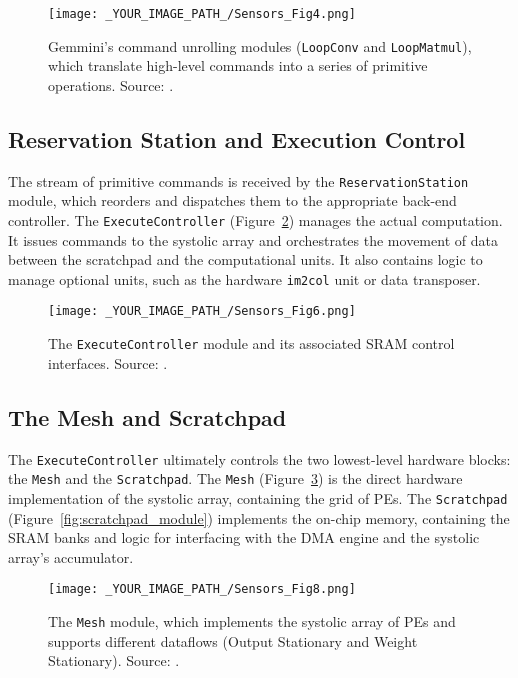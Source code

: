 \begin{figure}[htbp]
    \centering
    \texttt{[image: \_YOUR\_IMAGE\_PATH\_/Sensors\_Fig4.png]}
    \caption{Gemmini's command unrolling modules (\texttt{LoopConv} and \texttt{LoopMatmul}), which translate high-level commands into a series of primitive operations. Source: \cite{gookyi2023gemmini_case_study}.}
    \label{fig:command_unrollers}
\end{figure}

\subsection{Reservation Station and Execution Control}
The stream of primitive commands is received by the \texttt{ReservationStation} module, which reorders and dispatches them to the appropriate back-end controller. The \texttt{ExecuteController} (Figure~\ref{fig:execute_controller}) manages the actual computation. It issues commands to the systolic array and orchestrates the movement of data between the scratchpad and the computational units. It also contains logic to manage optional units, such as the hardware \texttt{im2col} unit or data transposer.

\begin{figure}[htbp]
    \centering
    \texttt{[image: \_YOUR\_IMAGE\_PATH\_/Sensors\_Fig6.png]}
    \caption{The \texttt{ExecuteController} module and its associated SRAM control interfaces. Source: \cite{gookyi2023gemmini_case_study}.}
    \label{fig:execute_controller}
\end{figure}

\subsection{The Mesh and Scratchpad}
The \texttt{ExecuteController} ultimately controls the two lowest-level hardware blocks: the \texttt{Mesh} and the \texttt{Scratchpad}. The \texttt{Mesh} (Figure~\ref{fig:mesh_module}) is the direct hardware implementation of the systolic array, containing the grid of PEs. The \texttt{Scratchpad} (Figure~\ref{fig:scratchpad_module}) implements the on-chip memory, containing the SRAM banks and logic for interfacing with the DMA engine and the systolic array's accumulator.

\begin{figure}[htbp]
    \centering
    \texttt{[image: \_YOUR\_IMAGE\_PATH\_/Sensors\_Fig8.png]}
    \caption{The \texttt{Mesh} module, which implements the systolic array of PEs and supports different dataflows (Output Stationary and Weight Stationary). Source: \cite{gookyi2023gemmini_case_study}.}
    \label{fig:mesh_module}
\end{figure}

